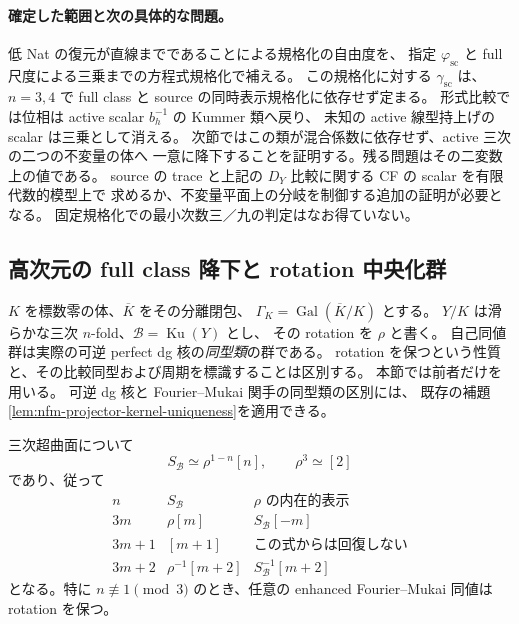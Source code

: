 \paragraph{確定した範囲と次の具体的な問題。}
低 Nat の復元が直線までであることによる規格化の自由度を、
指定 $\varphi_{\mathrm{sc}}$ と full 尺度による三乗までの方程式規格化で補える。
この規格化に対する $\gamma_{\mathrm{sc}}$ は、$n=3,4$ で
full class と source の同時表示規格化に依存せず定まる。
形式比較では位相は active scalar $b_h^{-1}$ の Kummer 類へ戻り、
未知の active 線型持上げの scalar は三乗として消える。
次節ではこの類が混合係数に依存せず、active 三次の二つの不変量の体へ
一意に降下することを証明する。残る問題はその二変数上の値である。
source の trace と上記の $D_Y$ 比較に関する CF の scalar を有限代数的模型上で
求めるか、不変量平面上の分岐を制御する追加の証明が必要となる。
固定規格化での最小次数三／九の判定はなお得ていない。



\subsection{高次元の full class 降下と rotation 中央化群}

$K$ を標数零の体、$\overline K$ をその分離閉包、
$\Gamma_K=\operatorname{Gal}(\overline K/K)$ とする。
$Y/K$ は滑らかな三次 $n$-fold、$\mathcal B=\operatorname{Ku}(Y)$ とし、
その rotation を $\rho$ と書く。
自己同値群は実際の可逆 perfect dg 核の\emph{同型類}の群である。
rotation を保つという性質と、その比較同型および周期を標識することは区別する。
本節では前者だけを用いる。
可逆 dg 核と Fourier--Mukai 関手の同型類の区別には、
既存の補題\ref{lem:nfm-projector-kernel-uniqueness}を適用できる。

\begin{proposition}
\label{prop:nfm-highdim-rotation-serre}
三次超曲面について
\[
 S_{\mathcal B}\simeq\rho^{1-n}[n],\qquad \rho^3\simeq[2]
\]
であり、従って
\[
\begin{array}{c|c|c}
 n&S_{\mathcal B}&\rho\text{ の内在的表示}\\ \hline
 3m&\rho[m]&S_{\mathcal B}[-m]\\
 3m+1&[m+1]&\text{この式からは回復しない}\\
 3m+2&\rho^{-1}[m+2]&S_{\mathcal B}^{-1}[m+2]
\end{array}
\]
となる。特に $n\not\equiv1\pmod3$ のとき、任意の enhanced
Fourier--Mukai 同値は rotation を保つ。
\end{proposition}

